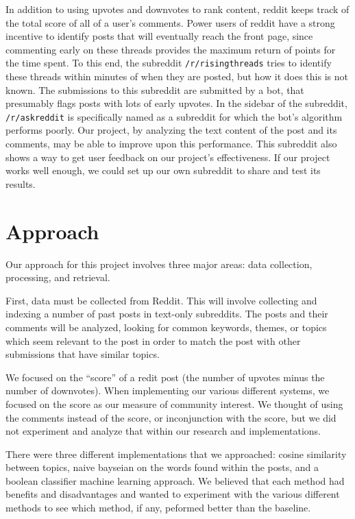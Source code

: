 \documentclass{acm_proc_article-sp}
\begin{document}
In addition to using upvotes and downvotes to rank content, reddit keeps track
of the total score of all of a user's comments. Power users of reddit have a
strong incentive to identify posts that will eventually reach the front page,
since commenting early on these threads provides the maximum return of points
for the time spent. To this end, the subreddit \texttt{/r/risingthreads} tries
to identify these threads within minutes of when they are posted, but how it
does this is not known. The submissions to this subreddit are submitted by a
bot, that presumably flags posts with lots of early upvotes. In the sidebar of
the subreddit, \texttt{/r/askreddit} is specifically named as a subreddit for
which the bot's algorithm performs poorly. Our project, by analyzing the text
content of the post and its comments, may be able to improve upon this
performance. This subreddit also shows a way to get user feedback on our
project's effectiveness. If our project works well enough, we could set up our
own subreddit to share and test its results.

\section{Approach}
Our approach for this project involves three major areas: data collection, processing, and retrieval.

First, data must be collected from Reddit.  This will involve collecting and indexing a number of past posts
in text-only subreddits.  The posts and their comments will be analyzed, looking for common keywords,
themes, or topics which seem relevant to the post in order to match the post with other submissions
that have similar topics.

We focused on the ``score'' of a redit post (the number of upvotes minus the number of downvotes). When implementing our various different systems, we focused on the score as our measure of community interest. We thought of using the comments instead of the score, or inconjunction with the score, but we did not experiment and analyze that within our research and implementations.

There were three different implementations that we approached: cosine similarity between topics, naive bayseian on the words found within the posts, and a boolean classifier machine learning approach. We believed that each method had benefits and disadvantages and wanted to experiment with the various different methods to see which method, if any, peformed better than the baseline.
\end{document}
